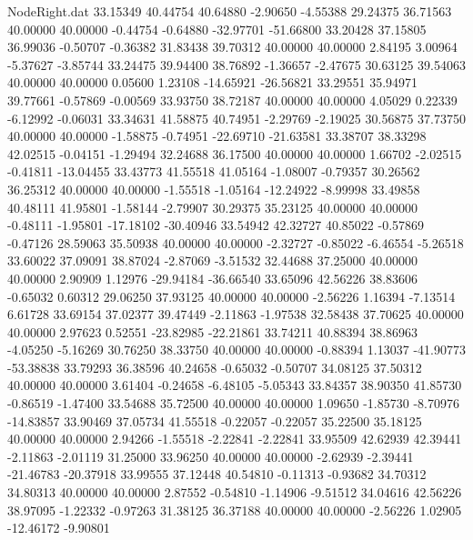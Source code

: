\begin{filecontents}{NodeRight.dat}
  33.15349   40.44754   40.64880    -2.90650   -4.55388   29.24375   36.71563   40.00000   40.00000   -0.44754   -0.64880  -32.97701  -51.66800
  33.20428   37.15805   36.99036    -0.50707   -0.36382   31.83438   39.70312   40.00000   40.00000    2.84195    3.00964   -5.37627   -3.85744
  33.24475   39.94400   38.76892    -1.36657   -2.47675   30.63125   39.54063   40.00000   40.00000    0.05600    1.23108  -14.65921  -26.56821
  33.29551   35.94971   39.77661    -0.57869   -0.00569   33.93750   38.72187   40.00000   40.00000    4.05029    0.22339   -6.12992   -0.06031
  33.34631   41.58875   40.74951    -2.29769   -2.19025   30.56875   37.73750   40.00000   40.00000   -1.58875   -0.74951  -22.69710  -21.63581
  33.38707   38.33298   42.02515    -0.04151   -1.29494   32.24688   36.17500   40.00000   40.00000    1.66702   -2.02515   -0.41811  -13.04455
  33.43773   41.55518   41.05164    -1.08007   -0.79357   30.26562   36.25312   40.00000   40.00000   -1.55518   -1.05164  -12.24922   -8.99998
  33.49858   40.48111   41.95801    -1.58144   -2.79907   30.29375   35.23125   40.00000   40.00000   -0.48111   -1.95801  -17.18102  -30.40946
  33.54942   42.32727   40.85022    -0.57869   -0.47126   28.59063   35.50938   40.00000   40.00000   -2.32727   -0.85022   -6.46554   -5.26518
  33.60022   37.09091   38.87024    -2.87069   -3.51532   32.44688   37.25000   40.00000   40.00000    2.90909    1.12976  -29.94184  -36.66540
  33.65096   42.56226   38.83606    -0.65032    0.60312   29.06250   37.93125   40.00000   40.00000   -2.56226    1.16394   -7.13514    6.61728
  33.69154   37.02377   39.47449    -2.11863   -1.97538   32.58438   37.70625   40.00000   40.00000    2.97623    0.52551  -23.82985  -22.21861
  33.74211   40.88394   38.86963    -4.05250   -5.16269   30.76250   38.33750   40.00000   40.00000   -0.88394    1.13037  -41.90773  -53.38838
  33.79293   36.38596   40.24658    -0.65032   -0.50707   34.08125   37.50312   40.00000   40.00000    3.61404   -0.24658   -6.48105   -5.05343
  33.84357   38.90350   41.85730    -0.86519   -1.47400   33.54688   35.72500   40.00000   40.00000    1.09650   -1.85730   -8.70976  -14.83857
  33.90469   37.05734   41.55518    -0.22057   -0.22057   35.22500   35.18125   40.00000   40.00000    2.94266   -1.55518   -2.22841   -2.22841
  33.95509   42.62939   42.39441    -2.11863   -2.01119   31.25000   33.96250   40.00000   40.00000   -2.62939   -2.39441  -21.46783  -20.37918
  33.99555   37.12448   40.54810    -0.11313   -0.93682   34.70312   34.80313   40.00000   40.00000    2.87552   -0.54810   -1.14906   -9.51512
  34.04616   42.56226   38.97095    -1.22332   -0.97263   31.38125   36.37188   40.00000   40.00000   -2.56226    1.02905  -12.46172   -9.90801

\end{filecontents}

